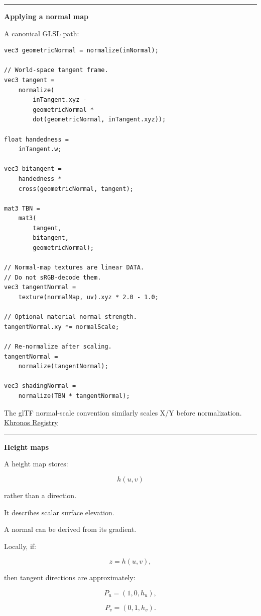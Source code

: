 \begin{center}\rule{0.5\linewidth}{0.5pt}\end{center}

\textbf{Applying a normal map}

A canonical GLSL path:

\begin{verbatim}
vec3 geometricNormal = normalize(inNormal);

// World-space tangent frame.
vec3 tangent =
    normalize(
        inTangent.xyz -
        geometricNormal *
        dot(geometricNormal, inTangent.xyz));

float handedness =
    inTangent.w;

vec3 bitangent =
    handedness *
    cross(geometricNormal, tangent);

mat3 TBN =
    mat3(
        tangent,
        bitangent,
        geometricNormal);

// Normal-map textures are linear DATA.
// Do not sRGB-decode them.
vec3 tangentNormal =
    texture(normalMap, uv).xyz * 2.0 - 1.0;

// Optional material normal strength.
tangentNormal.xy *= normalScale;

// Re-normalize after scaling.
tangentNormal =
    normalize(tangentNormal);

vec3 shadingNormal =
    normalize(TBN * tangentNormal);
\end{verbatim}

The glTF normal-scale convention similarly scales X/Y before normalization. \href{https://registry.khronos.org/glTF/specs/2.0/glTF-2.0.html?utm_source=chatgpt.com}{Khronos Registry}

\begin{center}\rule{0.5\linewidth}{0.5pt}\end{center}

\textbf{Height maps}

A height map stores:

\[
h(u,v)
\]

rather than a direction.

It describes scalar surface elevation.

A normal can be derived from its gradient.

Locally, if:

\[
z=h(u,v),
\]

then tangent directions are approximately:

\[
P_u=
(1,0,h_u),
\]

\[
P_v=
(0,1,h_v).
\]

